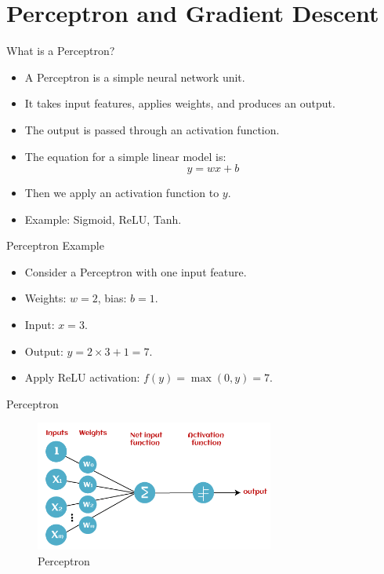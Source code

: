 \documentclass{beamer}
\begin{document}
\section{Perceptron and Gradient Descent}
\begin{frame}{What is a Perceptron?}
    \begin{itemize}
        \item A Perceptron is a simple neural network unit.
        \item It takes input features, applies weights, and produces an output.
        \item The output is passed through an activation function.
        \item The equation for a simple linear model is:
        \[
        y = wx + b
        \]
        \item Then we apply an activation function to \(y\).
        \item Example: Sigmoid, ReLU, Tanh.
    \end{itemize}
\end{frame}


\begin{frame}{Perceptron Example}
    \begin{itemize}
        \item Consider a Perceptron with one input feature.
        \item Weights: \(w = 2\), bias: \(b = 1\).
        \item Input: \(x = 3\).
        \item Output: \(y = 2 \times 3 + 1 = 7\).
        \item Apply ReLU activation: \(f(y) = \max(0, y) = 7\).
    \end{itemize}
\end{frame}


\begin{frame}{Perceptron}
    \begin{figure}
        \centering
\includegraphics[width=0.7\textwidth]{perceptron.png}
        \caption{Perceptron}
    \end{figure}
\end{frame}
\end{document}
